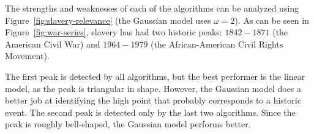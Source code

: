 The strengths and weaknesses of each of the algorithms can be analyzed using Figure~\ref{fig:slavery-relevance} (the Gaussian model uses $\omega = 2$). As can be seen in Figure~\ref{fig:war-series}, slavery has had two historic peaks: $1842 - 1871$ (the American Civil War) and $1964 - 1979$ (the African-American Civil Rights Movement).

The first peak is detected by all algorithms, but the best performer is the linear model, as the peak is triangular in shape. However, the Gaussian model does a better job at identifying the high point that probably corresponds to a historic event. The second peak is detected only by the last two algorithms. Since the peak is roughly bell-shaped, the Gaussian model performs better.